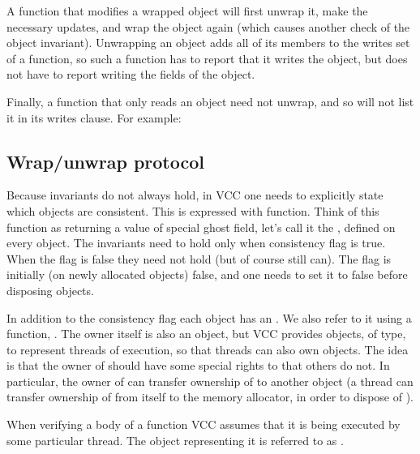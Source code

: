 A function that modifies a wrapped object will first unwrap it, make
the necessary updates, and wrap the object again (which causes another
check of the object invariant). Unwrapping an object adds all of its
members to the writes set of a function, so such a function has to
report that it writes the object, but does not have to report writing
the fields of the object.

Finally, a function that only reads an object need not unwrap, and so
will not list it in its writes clause. For example:



\subsection{Wrap/unwrap protocol}
\label{sect:wrap-unwrap}

Because invariants do not always hold,
in VCC one needs to explicitly state which objects are consistent.
This is expressed with  function.
Think of this function as returning a value of special ghost field,
let's call it the , defined on every object.
The invariants need to hold only when consistency flag is true.
When the flag is false they need not hold (but of course still can).
The flag is initially (on newly allocated objects) false,
and one needs to set it to false before disposing objects.

In addition to the consistency flag each object has an .
We also refer to it using a function, .
The owner itself is also an object, but VCC provides objects, of \vcc{\thread}
type, to represent threads of execution, so that threads can also own objects.
The idea is that the owner of  should have some special rights to  that others do not.
In particular, the owner of  can transfer ownership of  to
another object (\eg a thread can transfer ownership of  from itself to the memory allocator, 
in order to dispose of ).

When verifying a body of a function VCC assumes that it is being executed by some
particular thread.
The \vcc{\thread} object representing it is referred to as \vcc{\me}.

